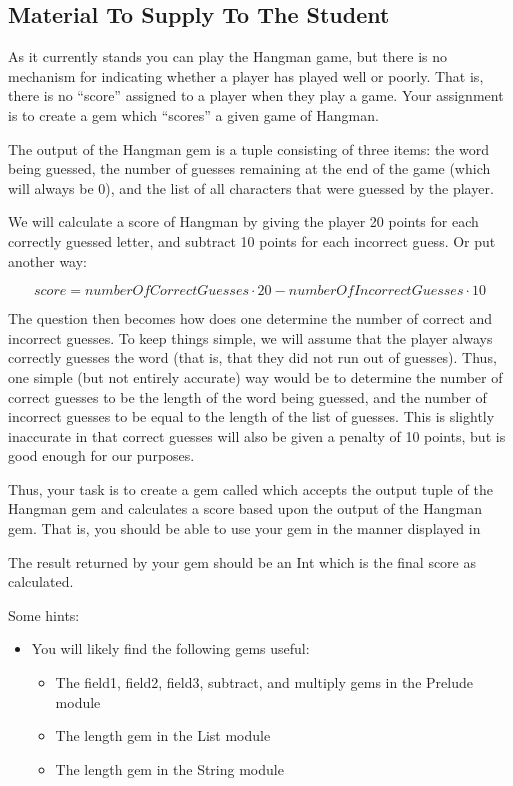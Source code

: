 \subsection*{Material To Supply To The Student}

As it currently stands you can play the Hangman game, but there is no mechanism for indicating whether a player has played well or poorly.  That is, there is no ``score'' assigned to a player when they play a game.  Your assignment is to create a gem which ``scores'' a given game of Hangman.

The output of the Hangman gem is a tuple consisting of three items: the word being guessed, the number of guesses remaining at the end of the game (which will always be 0), and the list of all characters that were guessed by the player.

We will calculate a score of Hangman by giving the player 20 points for each correctly guessed letter, and subtract 10 points for each incorrect guess.  Or put another way:

\begin{equation}
score = numberOfCorrectGuesses \cdot 20 - numberOfIncorrectGuesses \cdot 10
\end{equation}

The question then becomes how does one determine the number of correct and incorrect guesses.  To keep things simple, we will assume that the player always correctly guesses the word (that is, that they did not run out of guesses).  Thus, one simple (but not entirely accurate) way would be to determine the number of correct guesses to be the length of the word being guessed, and the number of incorrect guesses to be equal to the length of the list of guesses.  This is slightly inaccurate in that correct guesses will also be given a penalty of 10 points, but is good enough for our purposes.

Thus, your task is to create a gem called  which accepts the output tuple of the Hangman gem and calculates a score based upon the output of the Hangman gem.  That is, you should be able to use your gem in the manner displayed in 


The result returned by your  gem should be an Int which is the final score as calculated.

Some hints:

\begin{itemize}
	\item You will likely find the following gems useful: 
	\begin{itemize}
		\item The field1, field2, field3, subtract, and multiply gems in the Prelude module
		\item The length gem in the List module
		\item The length gem in the String module
	\end{itemize}
\end{itemize}